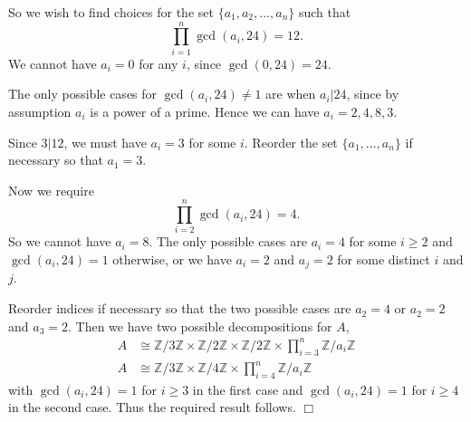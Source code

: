 \documentclass[10pt]{article}
\newenvironment{proof}[1][Proof]{\begin{trivlist}
\item[\hskip \labelsep {\bfseries #1}]}{\end{trivlist}}
\newcommand{\isom}{\cong}
\begin{document}
\begin{proof}
    So we wish to find choices for the set $\{a_1,a_2,\ldots,a_n\}$ such that
    \begin{equation*}
        \prod_{i=1}^n \gcd(a_i, 24) = 12.
    \end{equation*}
    We cannot have $a_i = 0$ for any $i$, since $\gcd(0,24) = 24$. 
    
    The only possible cases for $\gcd(a_i,24) \neq 1$ are when $a_i|24$, since
    by assumption $a_i$ is a power of a prime. Hence we can have $a_i = 2,4,8,3$.
    
    Since $3|12$, we must have $a_i = 3$ for some $i$. Reorder the set $\{a_1,\ldots,a_n\}$
    if necessary so that $a_1 = 3$.
    
    Now we require
    \begin{equation*}
        \prod_{i=2}^n \gcd(a_i,24) = 4.
    \end{equation*}
    So we cannot have $a_i = 8$. The only possible cases
    are $a_i = 4$ for some $i \geq 2$ and $\gcd(a_i,24) = 1$
    otherwise, or we have $a_i = 2$ and $a_j = 2$ for some distinct $i$ and $j$.
    
    Reorder indices if necessary so that the two possible cases are $a_2 = 4$
    or $a_2 = 2$ and $a_3 = 2$. Then we have two possible 
    decompositions for $A$,
    \begin{align*}
                A &\isom \mathbb{Z}/3\mathbb{Z}\times\mathbb{Z}/2\mathbb{Z}\times\mathbb{Z}/2\mathbb{Z}\times\prod_{i=3}^n\mathbb{Z}/a_i\mathbb{Z}\\
                A &\isom \mathbb{Z}/3\mathbb{Z}\times\mathbb{Z}/4\mathbb{Z}\times\prod_{i=4}^n\mathbb{Z}/a_i\mathbb{Z}
    \end{align*}
    with $\gcd(a_i,24) = 1$ for $i\geq 3$ in the first case and $\gcd(a_i,24) = 1$ for $i\geq 4$
    in the second case. Thus the required result follows. $\Box$   
\end{proof}
\end{document}
